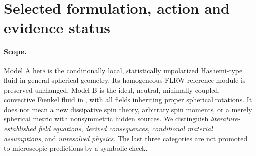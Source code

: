 \section{Selected formulation, action and evidence status}
\paragraph{Scope.} Model A here is the conditionally local, statistically unpolarized Hashemi-type fluid in general spherical geometry. Its homogeneous FLRW reference module is preserved unchanged. Model B is the ideal, neutral, minimally coupled, convective Frenkel fluid in \cite{BHL,OK}, with all fields inheriting proper spherical rotations. It does not mean a new dissipative spin theory, arbitrary spin moments, or a merely spherical metric with nonsymmetric hidden sources. We distinguish \emph{literature-established field equations}, \emph{derived consequences}, \emph{conditional material assumptions}, and \emph{unresolved physics}. The last three categories are not promoted to microscopic predictions by a symbolic check.

